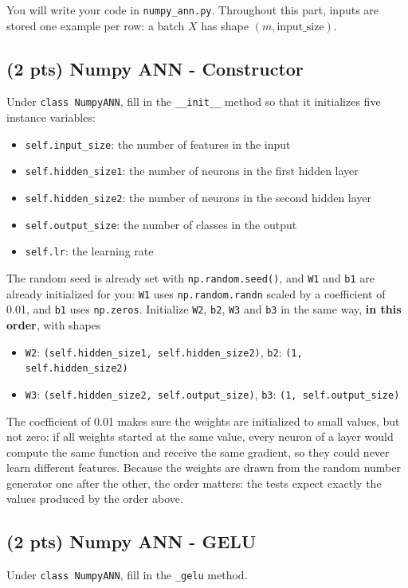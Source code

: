 \documentclass[11pt]{exam}
\begin{document}
You will write your code in \verb|numpy_ann.py|. Throughout this part, inputs are stored one example per row: a batch $X$ has shape $(m, \text{input\_size})$.

\subsection{(2 pts) Numpy ANN - Constructor}

Under \verb|class NumpyANN|, fill in the \verb|__init__| method so that it initializes five instance variables:
\begin{itemize}
    \item \verb|self.input_size|: the number of features in the input
    \item \verb|self.hidden_size1|: the number of neurons in the first hidden layer
    \item \verb|self.hidden_size2|: the number of neurons in the second hidden layer
    \item \verb|self.output_size|: the number of classes in the output
    \item \verb|self.lr|: the learning rate
\end{itemize}
The random seed is already set with \verb|np.random.seed()|, and \verb|W1| and \verb|b1| are already initialized for you: \verb|W1| uses \verb|np.random.randn| scaled by a coefficient of 0.01, and \verb|b1| uses \verb|np.zeros|. Initialize \verb|W2|, \verb|b2|, \verb|W3| and \verb|b3| in the same way, \textbf{in this order}, with shapes
\begin{itemize}
    \item \verb|W2|: \verb|(self.hidden_size1, self.hidden_size2)|, \verb|b2|: \verb|(1, self.hidden_size2)|
    \item \verb|W3|: \verb|(self.hidden_size2, self.output_size)|, \verb|b3|: \verb|(1, self.output_size)|
\end{itemize}

The coefficient of 0.01 makes sure the weights are initialized to small values, but not zero: if all weights started at the same value, every neuron of a layer would compute the same function and receive the same gradient, so they could never learn different features. Because the weights are drawn from the random number generator one after the other, the order matters: the tests expect exactly the values produced by the order above.

\subsection{(2 pts) Numpy ANN - GELU}
Under \verb|class NumpyANN|, fill in the \verb|_gelu| method.
\end{document}
